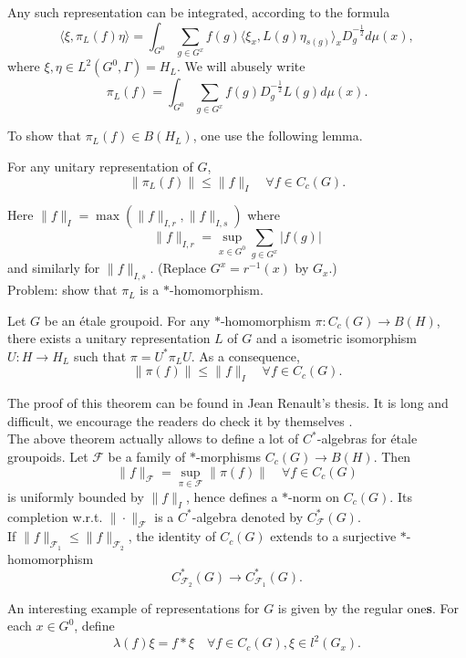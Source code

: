 Any such representation can be integrated, according to the formula
\[\langle \xi ,\pi_L(f) \eta \rangle = \int_{G^0} \sum_{g\in G^x}f(g)\langle \xi_x ,L(g) \eta_{s(g)} \rangle_x D_g^{-\frac{1}{2}}d\mu(x),\]
where $\xi,\eta \in L^2(G^0,\Gamma)=H_L$. We will abusely write
\[\pi_L(f) =\int_{G^0} \sum_{g\in G^x}f(g)D_g^{-\frac{1}{2}}L(g)d\mu(x). \]

To show that $\pi_L(f) \in B(H_L)$, one use the following lemma.

\begin{lem}
For any unitary representation of $G$, 
\[\|\pi_L(f)\| \leq \|f\|_I \quad \forall f\in C_c(G).\]
\end{lem}

Here $\|f\|_I = \max (\|f\|_{I,r} , \|f\|_{I,s})$ where 
\[\|f\|_{I,r} = \sup_{x\in G^0} \sum_{g\in G^x} |f(g)|\]
and similarly for $\|f\|_{I,s}$. (Replace $G^x = r^{-1}(x)$ by $G_x$.)\\

Problem: show that $\pi_L $ is a $*$-homomorphism.\\

\begin{thm}[Renault]
Let $G$ be an \'etale groupoid. For any $*$-homomorphism $\pi : C_c(G) \rightarrow B(H)$, there exists a unitary representation $L$ of $G$ and a isometric isomorphism $U: H \rightarrow H_L$ such that $\pi = U^*\pi_L U$. As a consequence, 
\[\|\pi(f)\| \leq \|f\|_I \quad \forall f\in C_c(G).\]
\end{thm}

The proof of this theorem can be found in Jean Renault's thesis. It is long and difficult, we encourage the readers do check it by themselves	.\\

The above theorem actually allows to define a lot of $C^*$-algebras for \'etale groupoids. Let $\mathcal F$ be a family of $*$-morphisms $C_c(G) \rightarrow B(H)$. Then 
\[\|f\|_{\mathcal F} = \sup_{\pi \in \mathcal F} \|\pi(f)\| \quad \forall f\in C_c(G)\]
is uniformly bounded by $\|f\|_I$, hence defines a $*$-norm on $C_c(G)$. Its completion w.r.t. $\|\cdot \|_{\mathcal F}$ is a $C^*$-algebra denoted by $C^*_{\mathcal F}(G)$.\\

If $\|f\|_{\mathcal F_1} \leq \|f\|_{\mathcal F_2}$, the identity of $C_c(G)$ extends to a surjective $*$-homomorphism
\[C^*_{\mathcal F_2}(G) \rightarrow C^*_{\mathcal F_1}(G).\]

An interesting example of representations for $G$ is given by the regular one\textbf{s}. For each $x\in G^0$, define 
\[\lambda(f)\xi = f\ast \xi \quad \forall f\in C_c(G), \xi \in l^2(G_x).\]


